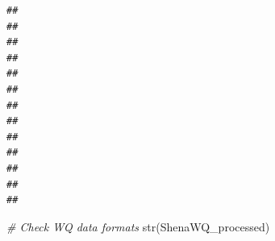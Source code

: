 \documentclass[
  12pt,
]{article}
\newenvironment{Shaded}{\begin{snugshade}}{\end{snugshade}}
\newcommand{\CommentTok}[1]{\textcolor[rgb]{0.56,0.35,0.01}{\textit{#1}}}
\newcommand{\FunctionTok}[1]{\textcolor[rgb]{0.00,0.00,0.00}{#1}}
\newcommand{\NormalTok}[1]{#1}
\begin{document}
\begin{verbatim}
##                                                     
##                                                     
##                                                     
##                                                     
##                                                     
##                                                     
##                                                     
##                                                     
##                                                     
##                                                     
##                                                     
##                                                     
## 
\end{verbatim}

\begin{Shaded}
\begin{Highlighting}[]
\CommentTok{\# Check WQ data formats}
\FunctionTok{str}\NormalTok{(ShenaWQ\_processed)}
\end{Highlighting}
\end{Shaded}
\end{document}
